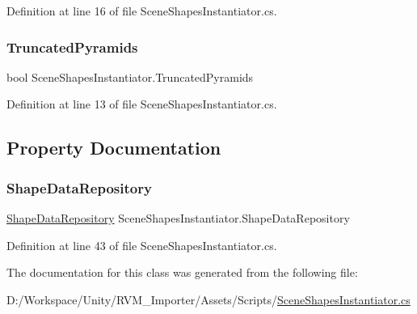 Definition at line 16 of file Scene\+Shapes\+Instantiator.\+cs.

\mbox{\label{class_scene_shapes_instantiator_a96b27a2b4d7a93b85ebd729a97e46534}} 
\subsubsection{\texorpdfstring{TruncatedPyramids}{TruncatedPyramids}}
{\footnotesize\ttfamily bool Scene\+Shapes\+Instantiator.\+Truncated\+Pyramids}



Definition at line 13 of file Scene\+Shapes\+Instantiator.\+cs.



\subsection{Property Documentation}
\mbox{\label{class_scene_shapes_instantiator_a59448891f574b4153d072c9815f626e4}} 
\subsubsection{\texorpdfstring{ShapeDataRepository}{ShapeDataRepository}}
{\footnotesize\ttfamily \mbox{\hyperlink{class_shape_data_repository}{Shape\+Data\+Repository}} Scene\+Shapes\+Instantiator.\+Shape\+Data\+Repository\hspace{0.3cm}{\ttfamily [get]}}



Definition at line 43 of file Scene\+Shapes\+Instantiator.\+cs.



The documentation for this class was generated from the following file\+:\begin{DoxyCompactItemize}
\item 
D\+:/\+Workspace/\+Unity/\+R\+V\+M\+\_\+\+Importer/\+Assets/\+Scripts/\mbox{\hyperlink{_scene_shapes_instantiator_8cs}{Scene\+Shapes\+Instantiator.\+cs}}\end{DoxyCompactItemize}
